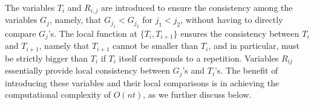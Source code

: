 The variables $T_i$ and $R_{i,j}$ are introduced to ensure the
consistency among the variables $G_j$, namely, that $G_{j_1} <
G_{j_2}$ for $j_1< j_2$, without having to directly compare $G_j$'s.
The local function at $\{T_i,T_{i+1}\}$ ensures the consistency
between $T_i$ and $T_{i+1}$, namely that $T_{i+1}$ cannot be smaller
than $T_{i}$, and in particular, must be strictly bigger than $T_i$
if $T_i$ itself corresponds to a repetition. Variables $R_{ij}$
essentially provide local consistency between $G_j$'s and $T_i$'s.
The benefit of introducing these variables and their local
comparisons is in achieving the computational complexity of $O(nt)$,
as we further discuss below.

